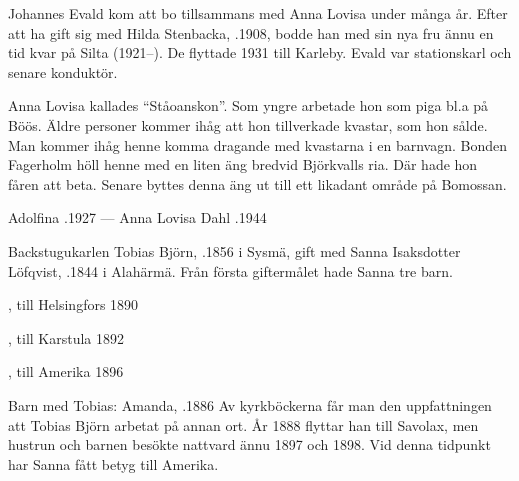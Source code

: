 Johannes Evald kom att bo tillsammans med Anna Lovisa under många år. Efter att ha gift sig med Hilda Stenbacka,  .1908, bodde han med sin nya fru ännu en tid kvar på Silta (1921--). De flyttade 1931 till Karleby. Evald var stationskarl och senare konduktör.

Anna Lovisa kallades ``Ståoanskon''. Som yngre arbetade hon som piga bl.a på Böös. Äldre personer kommer ihåg att hon tillverkade kvastar, som hon sålde. Man kommer ihåg henne komma dragande med kvastarna i en barnvagn. Bonden Fagerholm höll henne med en liten äng bredvid Björkvalls ria. Där hade hon fåren att beta.  Senare byttes denna äng ut till ett likadant område på Bomossan.

Adolfina .1927  ---  Anna Lovisa Dahl .1944


%
Backstugukarlen Tobias Björn, .1856 i Sysmä, gift med Sanna Isaksdotter Löfqvist, .1844 i Alahärmä.
Från första giftermålet hade Sanna tre barn.
\begin{jhchildren}
  \item {}, till Helsingfors 1890
  \item {}, till Karstula 1892
  \item {}, till Amerika 1896
\end{jhchildren}

Barn med Tobias: Amanda, .1886
Av kyrkböckerna får man den uppfattningen att Tobias Björn arbetat på annan ort. År 1888 flyttar han till Savolax, men hustrun och barnen besökte nattvard ännu 1897 och 1898. Vid denna tidpunkt har Sanna fått betyg till Amerika.


